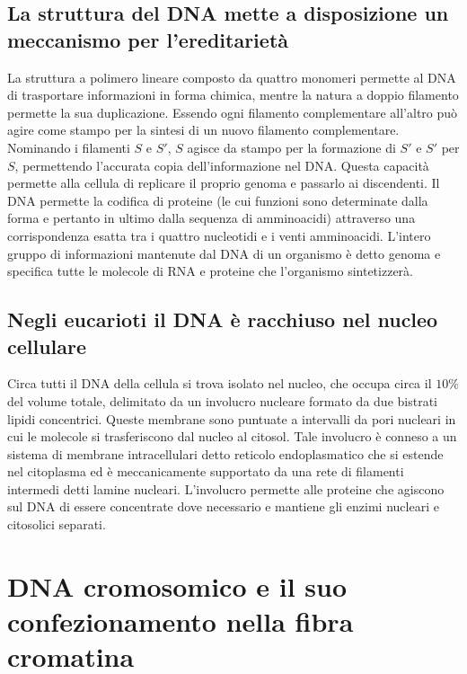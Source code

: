 \subsection{La struttura del DNA mette a disposizione un meccanismo per l'ereditariet\`a}
La struttura a polimero lineare composto da quattro monomeri permette al DNA di trasportare informazioni in forma chimica, mentre la natura a doppio filamento permette la sua 
duplicazione. Essendo ogni filamento complementare all'altro pu\`o agire come stampo per la sintesi di un nuovo filamento complementare. Nominando i filamenti $S$ e $S'$, $S$ agisce
da stampo per la formazione di $S'$ e $S'$ per $S$, permettendo l'accurata copia dell'informazione nel DNA. Questa capacit\`a permette alla cellula di replicare il proprio genoma
e passarlo ai discendenti. Il DNA permette la codifica di proteine (le cui funzioni sono determinate dalla forma e pertanto in ultimo dalla sequenza di amminoacidi) attraverso una
corrispondenza esatta tra i quattro nucleotidi e i venti amminoacidi. L'intero gruppo di informazioni mantenute dal DNA di un organismo \`e detto genoma e specifica tutte le molecole
di RNA e proteine che l'organismo sintetizzer\`a. 
\subsection{Negli eucarioti il DNA \`e racchiuso nel nucleo cellulare}
Circa tutti il DNA della cellula si trova isolato nel nucleo, che occupa circa il $10\%$ del volume totale, delimitato da un involucro nucleare formato da due bistrati lipidi 
concentrici. Queste membrane sono puntuate a intervalli da pori nucleari in cui le molecole si trasferiscono dal nucleo al citosol. Tale involucro \`e conneso a un sistema di 
membrane intracellulari detto reticolo endoplasmatico che si estende nel citoplasma ed \`e meccanicamente supportato da una rete di filamenti intermedi detti lamine nucleari. L'involucro
permette alle proteine che agiscono sul DNA di essere concentrate dove necessario e mantiene gli enzimi nucleari e citosolici separati. 
\section{DNA cromosomico e il suo confezionamento nella fibra cromatina}
